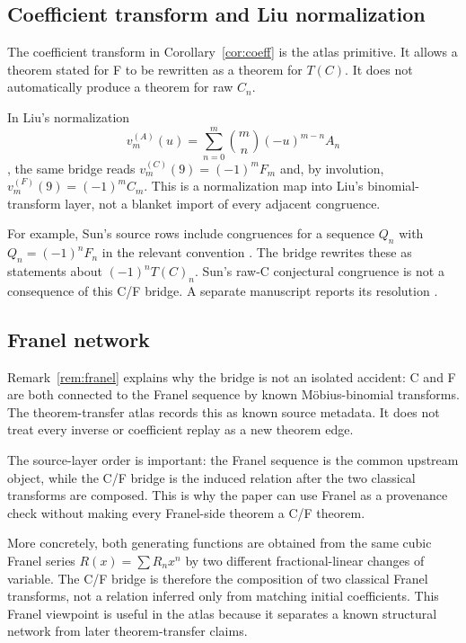 \documentclass[11pt,a4paper]{article}
\begin{document}
\subsection{Coefficient transform and Liu normalization}
\label{subsec:coeff-transport}

The coefficient transform in Corollary~\ref{cor:coeff} is the atlas primitive.
It allows a theorem stated for F to be rewritten as a theorem for $T(C)$.  It
does not automatically produce a theorem for raw $C_n$.

In Liu's normalization
\[
  v_m^{(A)}(u)=\sum_{n=0}^m\binom{m}{n}(-u)^{m-n}A_n
\]
\cite{liu_2025_binomial_transforms}, the same bridge reads
$v_m^{(C)}(9)=(-1)^mF_m$ and, by involution,
$v_m^{(F)}(9)=(-1)^mC_m$.  This is a normalization map into Liu's
binomial-transform layer, not a blanket import of every adjacent congruence.

For example, Sun's source rows include congruences for a sequence $Q_n$ with
$Q_n=(-1)^nF_n$ in the relevant convention
\cite{sun_2022_supercongruences}.  The bridge rewrites these as statements
about $(-1)^nT(C)_n$.  Sun's raw-C conjectural congruence is not a consequence
of this C/F bridge.  A separate manuscript reports its resolution
\cite{babanskyy_2026_sun35_bridge}.

\subsection{Franel network}

Remark~\ref{rem:franel} explains why the bridge is not an isolated accident:
C and F are both connected to the Franel sequence by known
M\"obius-binomial transforms.  The theorem-transfer atlas records this as
known source metadata.  It does not treat every inverse or coefficient replay
as a new theorem edge.

The source-layer order is important: the Franel sequence is the common
upstream object, while the C/F bridge is the induced relation after the two
classical transforms are composed.  This is why the paper can use Franel as
a provenance check without making every Franel-side theorem a C/F theorem.

More concretely, both generating functions are obtained from the same cubic
Franel series $R(x)=\sum R_nx^n$ by two different fractional-linear changes of
variable.  The C/F bridge is therefore the composition of two classical
Franel transforms, not a relation inferred only from matching initial
coefficients.  This Franel viewpoint is useful in the atlas because it
separates a known structural network from later theorem-transfer claims.
\end{document}
